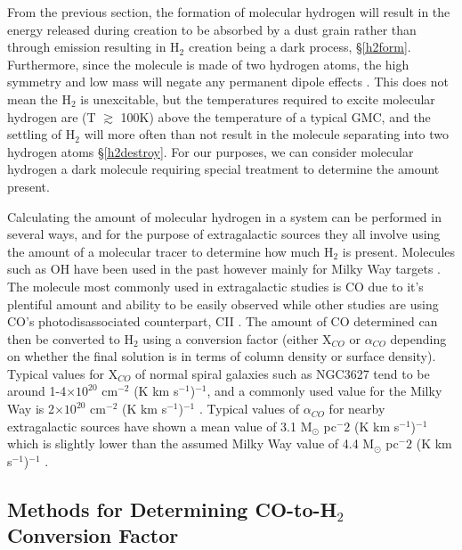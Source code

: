 From the previous section, the formation of molecular hydrogen will result in the energy released during creation to be absorbed by a dust grain rather than through emission resulting in H$_2$ creation being a dark process, \S\ref{h2form}.  Furthermore, since the molecule is made of two hydrogen atoms, the high symmetry and low mass will negate any permanent dipole effects \citep{bolatto2013,kennicutt2012}.  This does not mean the H$_2$ is unexcitable, but the temperatures required to excite molecular hydrogen are (T $\gtrsim$ 100K) above the temperature of a typical GMC\citep{bolatto2013}, and the settling of H$_2$ will more often than not result in the molecule separating into two hydrogen atoms \S\ref{h2destroy}.  For our purposes, we can consider molecular hydrogen a dark molecule requiring special treatment to determine the amount present.

Calculating the amount of molecular hydrogen in a system can be performed in several ways, and for the purpose of extragalactic sources they all involve using the amount of a molecular tracer to determine how much H$_2$ is present.  Molecules such as OH have been used in the past however mainly for Milky Way targets \citep{barrett1964}.  The molecule most commonly used in extragalactic studies is CO due to it's plentiful amount and ability to be easily observed \citep{bolatto2013} while other studies are using CO's photodisassociated counterpart, CII \citep{madden1997}.  The amount of CO determined can then be converted to H$_2$ using a conversion factor (either X$_{CO}$ or $\alpha_{CO}$ depending on whether the final solution is in terms of column density or surface density).  Typical values for X$_{CO}$ of normal spiral galaxies such as NGC3627 tend to be around 1-4$\times 10^{20}$ cm$^{-2}$ (K km s$^{-1}$)$^{-1}$, and a commonly used value for the Milky Way is 2$\times 10^{20}$ cm$^{-2}$ (K km s$^{-1}$)$^{-1}$ \citep{bolatto2013}. Typical values of $\alpha_{CO}$ for nearby extragalactic sources have shown a mean value of 3.1 M$_\odot$ pc$^-2$ (K km s$^{-1}$)$^{-1}$ which is slightly lower than the assumed Milky Way value of 4.4 M$_\odot$ pc$^-2$ (K km s$^{-1}$)$^{-1}$ \citep{sandstrom2013}.

\subsection{Methods for Determining CO-to-H$_2$ Conversion Factor}

